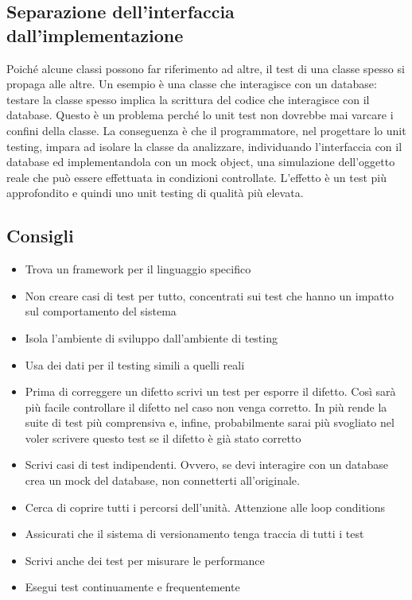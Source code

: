 \documentclass[11pt,a4paper]{book}
\begin{document}
\subsection{Separazione dell'interfaccia dall'implementazione}
Poiché alcune classi possono far riferimento ad altre, il test di una classe spesso si propaga alle altre. Un esempio è una classe che interagisce con un database: testare la classe spesso implica la scrittura del codice che interagisce con il database. Questo è un problema perché lo unit test non dovrebbe mai varcare i confini della classe. La conseguenza è che il programmatore, nel progettare lo unit testing, impara ad isolare la classe da analizzare, individuando l'interfaccia con il database ed implementandola con un mock object, una simulazione dell'oggetto reale che può essere effettuata in condizioni controllate. L'effetto è un test più approfondito e quindi uno unit testing di qualità più elevata.

\subsection{Consigli}
\begin{itemize}
	\item Trova un framework per il linguaggio specifico
	\item Non creare casi di test per tutto, concentrati sui test che hanno un impatto sul comportamento del sistema
	\item Isola l'ambiente di sviluppo dall'ambiente di testing
	\item Usa dei dati per il testing simili a quelli reali
	\item Prima di correggere un difetto scrivi un test per esporre il difetto. Così sarà più facile controllare il difetto nel caso non venga corretto. In più rende la suite di test più comprensiva e, infine, probabilmente sarai più svogliato nel voler scrivere questo test se il difetto è già stato corretto
	\item Scrivi casi di test indipendenti. Ovvero, se devi interagire con un database crea un mock del database, non connetterti all'originale.
	\item  Cerca di coprire tutti i percorsi dell'unità. Attenzione alle loop conditions
	\item Assicurati che il sistema di versionamento tenga traccia di tutti i test
	\item Scrivi anche dei test per misurare le performance
	\item Esegui test continuamente e frequentemente
\end{itemize}
\end{document}
